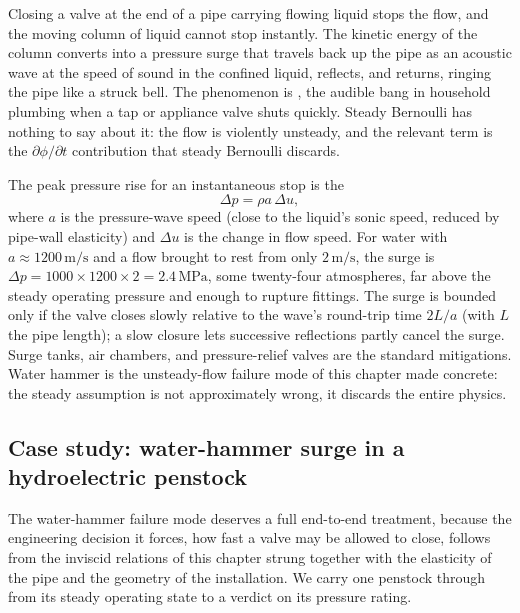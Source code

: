 Closing a valve at the end of a pipe carrying flowing liquid stops the
flow, and the moving column of liquid cannot stop instantly. The
kinetic energy of the column converts into a pressure surge that
travels back up the pipe as an acoustic wave at the speed of sound in
the confined liquid, reflects, and returns, ringing the pipe like a
struck bell. The phenomenon is , the audible
bang in household plumbing when a tap or appliance valve shuts
quickly. Steady Bernoulli has nothing to say about it: the flow is
violently unsteady, and the relevant term is the $\partial\phi/
\partial t$ contribution that steady Bernoulli discards.

The peak pressure rise for an instantaneous stop is the
\[
\Delta p = \rho a\,\Delta u,
\]
where $a$ is the pressure-wave speed (close to the liquid's sonic
speed, reduced by pipe-wall elasticity) and $\Delta u$ is the change
in flow speed. For water with $a \approx 1200\,\si{\meter\per\second}$
and a flow brought to rest from only $2\,\si{\meter\per\second}$, the
surge is $\Delta p = 1000\times 1200\times 2 = 2.4\,\text{MPa}$, some
twenty-four atmospheres, far above the steady operating pressure and
enough to rupture fittings. The surge is bounded only if the valve
closes slowly relative to the wave's round-trip time $2L/a$ (with $L$
the pipe length); a slow closure lets successive reflections partly
cancel the surge. Surge tanks, air chambers, and pressure-relief
valves are the standard mitigations. Water hammer is the
unsteady-flow failure mode of this chapter made concrete: the steady
assumption is not approximately wrong, it discards the entire
physics.

\subsection{Case study: water-hammer surge in a hydroelectric
penstock}

The water-hammer failure mode deserves a full end-to-end treatment,
because the engineering decision it forces, how fast a valve may be
allowed to close, follows from the inviscid relations of this chapter
strung together with the elasticity of the pipe and the geometry of
the installation. We carry one penstock through from its steady
operating state to a verdict on its pressure rating.



